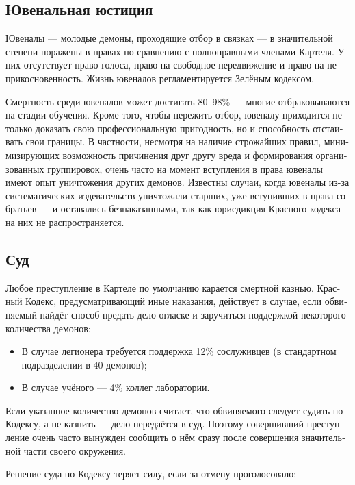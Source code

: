 \documentclass[a4paper,12pt,fleqn]{book}\usepackage{cooltooltips}\usepackage{polyglossia}\setdefaultlanguage[babelshorthands=true]{russian}\setotherlanguage{english}\defaultfontfeatures{Ligatures=TeX,Mapping=tex-text} \usepackage{xcolor}\definecolor{lightgray}{HTML}{bbbbbb}\color{lightgray}\newcommand{\ml}[3]{\textenglish{\textcolor{black}{#3}}}
\begin{document}
{\subsection{Ювенальная юстиция}

Ювеналы --- молодые демоны, проходящие отбор в связках --- в значительной степени поражены в правах по сравнению с полноправными членами Картеля.
У них отсутствует право голоса, право на свободное передвижение и право на неприкосновенность.
Жизнь ювеналов регламентируется Зелёным кодексом.

Смертность среди ювеналов может достигать 80--98\% --- многие отбраковываются на стадии обучения.
Кроме того, чтобы пережить отбор, ювеналу приходится не только доказать свою профессиональную пригодность, но и способность отстаивать свои границы.
В частности, несмотря на наличие строжайших правил, минимизирующих возможность причинения друг другу вреда и формирования организованных группировок, очень часто на момент вступления в права ювеналы имеют опыт уничтожения других демонов.
Известны случаи, когда ювеналы из-за систематических издевательств уничтожали старших, уже вступивших в права собратьев --- и оставались безнаказанными, так как юрисдикция Красного кодекса на них не распространяется.

\subsection{Суд}

Любое преступление в Картеле по умолчанию карается смертной казнью.
Красный Кодекс, предусматривающий иные наказания, действует в случае, если обвиняемый найдёт способ предать дело огласке и заручиться поддержкой некоторого количества демонов:

\begin{itemize}
\item В случае легионера требуется поддержка 12\% сослуживцев (в стандартном подразделении в 40 демонов);
\item В случае учёного --- 4\% коллег лаборатории.
\end{itemize}

Если указанное количество демонов считает, что обвиняемого следует судить по Кодексу, а не казнить --- дело передаётся в суд.
Поэтому совершивший преступление очень часто вынужден сообщить о нём сразу после совершения значительной части своего окружения.

Решение суда по Кодексу теряет силу, если за отмену проголосовало:

}
\end{document}
